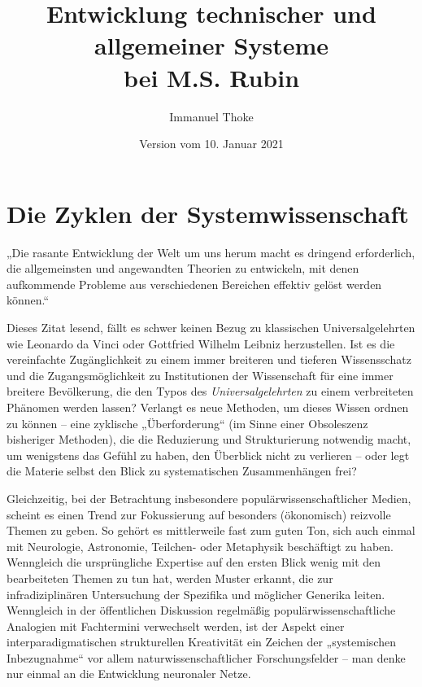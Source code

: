 \documentclass[a4paper,11pt]{article}
\author{Immanuel Thoke}
\title{Entwicklung technischer und allgemeiner Systeme\\ bei M.S. Rubin}
\date{Version vom 10. Januar 2021}
\begin{document}
\maketitle
\section{Die Zyklen der Systemwissenschaft}
„Die rasante Entwicklung der Welt um uns herum macht es dringend erforderlich,
die allgemeinsten und angewandten Theorien zu entwickeln, mit denen
aufkommende Probleme aus verschiedenen Bereichen effektiv gelöst werden
können.“ \cite{Rubin2002}

Dieses Zitat lesend, fällt es schwer keinen Bezug zu klassischen
Universalgelehrten wie Leonardo da Vinci oder Gottfried Wilhelm Leibniz
herzustellen.  Ist es die vereinfachte Zugänglichkeit zu einem immer breiteren
und tieferen Wissensschatz und die Zugangsmöglichkeit zu Institutionen der
Wissenschaft für eine immer breitere Bevölkerung, die den Typos des
\emph{Universalgelehrten} zu einem verbreiteten Phänomen werden lassen?
Verlangt es neue Methoden, um dieses Wissen ordnen zu können -- eine zyklische
„Überforderung“ (im Sinne einer Obsoleszenz bisheriger Methoden), die die
Reduzierung und Strukturierung notwendig macht, um wenigstens das Gefühl zu
haben, den Überblick nicht zu verlieren -- oder legt die Materie selbst den
Blick zu systematischen Zusammenhängen frei?

Gleichzeitig, bei der Betrachtung insbesondere populärwissenschaftlicher
Medien, scheint es einen Trend zur Fokussierung auf besonders (ökonomisch)
reizvolle Themen zu geben. So gehört es mittlerweile fast zum guten Ton, sich
auch einmal mit Neurologie, Astronomie, Teilchen- oder Metaphysik beschäftigt
zu haben. Wenngleich die ursprüngliche Expertise auf den ersten Blick wenig
mit den bearbeiteten Themen zu tun hat, werden Muster erkannt, die zur
infradiziplinären Untersuchung der Spezifika und möglicher Generika leiten.
Wenngleich in der öffentlichen Diskussion regelmäßig populärwissenschaftliche
Analogien mit Fachtermini verwechselt werden, ist der Aspekt einer
interparadigmatischen strukturellen Kreativität ein Zeichen der „systemischen
Inbezugnahme“ vor allem naturwissenschaftlicher Forschungsfelder -- man denke
nur einmal an die Entwicklung neuronaler Netze.
\end{document}
